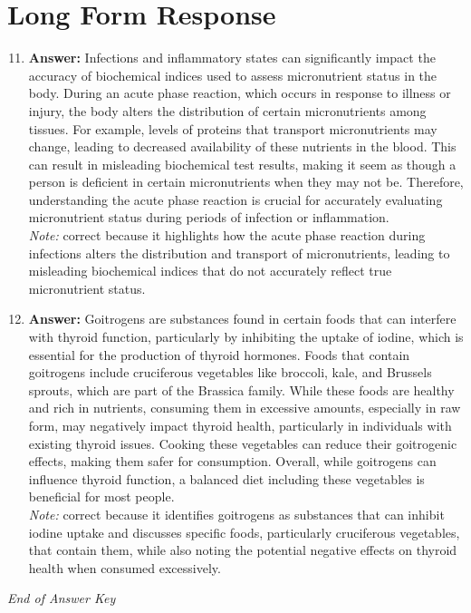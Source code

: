 \documentclass[12pt]{article}
\begin{document}
\section*{Long Form Response}
\begin{enumerate}[label=\arabic*.]
\setcounter{enumi}{10}
\item \textbf{Answer:} Infections and inflammatory states can significantly impact the accuracy of biochemical indices used to assess micronutrient status in the body. During an acute phase reaction, which occurs in response to illness or injury, the body alters the distribution of certain micronutrients among tissues. For example, levels of proteins that transport micronutrients may change, leading to decreased availability of these nutrients in the blood. This can result in misleading biochemical test results, making it seem as though a person is deficient in certain micronutrients when they may not be. Therefore, understanding the acute phase reaction is crucial for accurately evaluating micronutrient status during periods of infection or inflammation.
\\ \textit{Note:} correct because it highlights how the acute phase reaction during infections alters the distribution and transport of micronutrients, leading to misleading biochemical indices that do not accurately reflect true micronutrient status.
\item \textbf{Answer:} Goitrogens are substances found in certain foods that can interfere with thyroid function, particularly by inhibiting the uptake of iodine, which is essential for the production of thyroid hormones. Foods that contain goitrogens include cruciferous vegetables like broccoli, kale, and Brussels sprouts, which are part of the Brassica family. While these foods are healthy and rich in nutrients, consuming them in excessive amounts, especially in raw form, may negatively impact thyroid health, particularly in individuals with existing thyroid issues. Cooking these vegetables can reduce their goitrogenic effects, making them safer for consumption. Overall, while goitrogens can influence thyroid function, a balanced diet including these vegetables is beneficial for most people.
\\ \textit{Note:} correct because it identifies goitrogens as substances that can inhibit iodine uptake and discusses specific foods, particularly cruciferous vegetables, that contain them, while also noting the potential negative effects on thyroid health when consumed excessively.
\end{enumerate}

\vfill
\noindent\textit{End of Answer Key}
\end{document}
